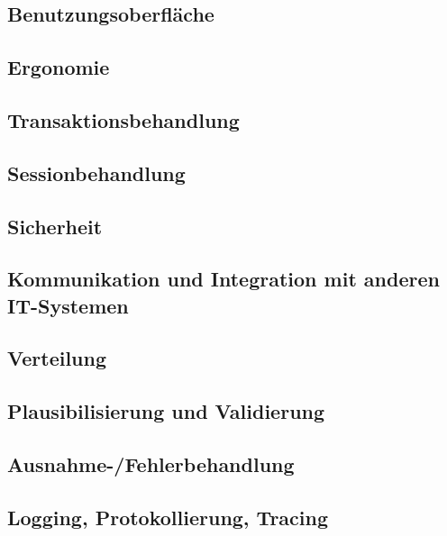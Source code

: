 \documentclass[pdftex,12pt,a4paper]{article}
\begin{document}
\subsection{Benutzungsoberfläche}

\subsection{Ergonomie}

\subsection{Transaktionsbehandlung}

\subsection{Sessionbehandlung}

\subsection{Sicherheit}

\subsection{Kommunikation und Integration mit anderen IT-Systemen}

\subsection{Verteilung}

\subsection{Plausibilisierung und Validierung}

\subsection{Ausnahme-/Fehlerbehandlung}

\subsection{Logging, Protokollierung, Tracing}
\end{document}
